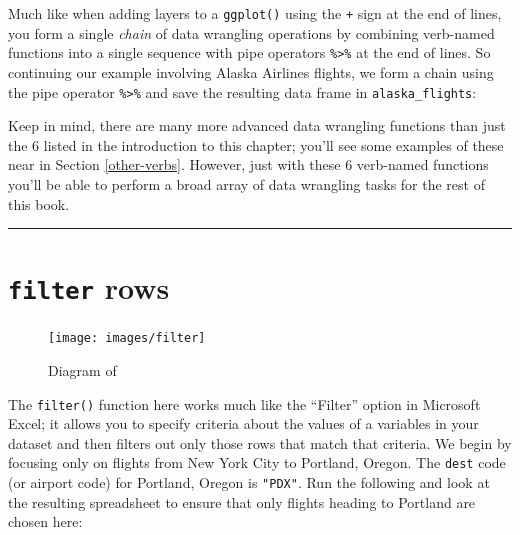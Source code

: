\documentclass[12pt, krantz2,]{krantz}
\makeatletter
\newenvironment{Shaded}{\begin{snugshade}}{\end{snugshade}}
\newcommand{\KeywordTok}[1]{\textcolor[rgb]{0.27,0.27,0.27}{\textbf{#1}}}
\newcommand{\NormalTok}[1]{#1}
\newcommand{\OperatorTok}[1]{\textcolor[rgb]{0.43,0.43,0.43}{\textbf{#1}}}
\newcommand{\StringTok}[1]{\textcolor[rgb]{0.5,0.5,0.5}{#1}}
\newenvironment{kframe}{%
\medskip{}
\setlength{\fboxsep}{.8em}
 \def\at@end@of@kframe{}%
 \ifinner\ifhmode%
  \def\at@end@of@kframe{\end{minipage}}%
  \begin{minipage}{\columnwidth}%
 \fi\fi%
 \def\FrameCommand##1{\hskip\@totalleftmargin \hskip-\fboxsep
 \colorbox{shadecolor}{##1}\hskip-\fboxsep
     \hskip-\linewidth \hskip-\@totalleftmargin \hskip\columnwidth}%
 \MakeFramed {\advance\hsize-\width
   \@totalleftmargin\z@ \linewidth\hsize
   \@setminipage}}%
 {\par\unskip\endMakeFramed%
 \at@end@of@kframe}
\renewenvironment{Shaded}{\begin{kframe}}{\end{kframe}}
\makeatother
\begin{document}
Much like when adding layers to a \texttt{ggplot()} using the \texttt{+} sign at the end of lines, you form a single \emph{chain} of data wrangling operations by combining verb-named functions into a single sequence with pipe operators \texttt{\%\textgreater{}\%} at the end of lines. So continuing our example involving Alaska Airlines flights, we form a chain using the pipe operator \texttt{\%\textgreater{}\%} and save the resulting data frame in \texttt{alaska\_flights}:

\begin{Shaded}
\end{Shaded}

Keep in mind, there are many more advanced data wrangling functions than just the 6 listed in the introduction to this chapter; you'll see some examples of these near in Section \ref{other-verbs}. However, just with these 6 verb-named functions you'll be able to perform a broad array of data wrangling tasks for the rest of this book.

\begin{center}\rule{0.5\linewidth}{\linethickness}\end{center}

\hypertarget{filter}{%
\section{\texorpdfstring{\texttt{filter} rows}{filter rows}}\label{filter}}

\begin{figure}

{\centering \texttt{[image: images/filter]} 

}

\caption{Diagram of }\label{fig:filter}
\end{figure}

The \texttt{filter()} function here works much like the ``Filter'' option in Microsoft Excel; it allows you to specify criteria about the values of a variables in your dataset and then filters out only those rows that match that criteria. We begin by focusing only on flights from New York City to Portland, Oregon. The \texttt{dest} code (or airport code) for Portland, Oregon is \texttt{"PDX"}. Run the following and look at the resulting spreadsheet to ensure that only flights heading to Portland are chosen here:
\end{document}
